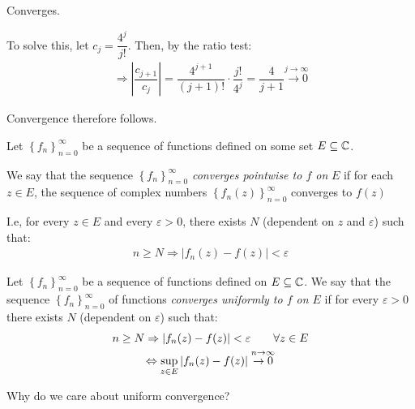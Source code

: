 \noindent Converges.
\par\bigskip
\noindent To solve this, let $c_j = \dfrac{4^j}{j!}$. Then, by the ratio test:
\begin{equation*}
  \begin{gathered}
    \Rightarrow \left|\dfrac{c_{j+1}}{c_j}\right| = \dfrac{4^{j+1}}{(j+1)!}\cdot\dfrac{j!}{4^j} = \dfrac{4}{j+1}\stackrel{j\to\infty}{\to0}
  \end{gathered}
\end{equation*}\par
\noindent Convergence therefore follows.
\newpage
\begin{theo}{}
  Let $\left\{f_n\right\}_{n=0}^\infty$ be a sequence of functions defined on some set $E\subseteq\mathbb{C}$.\par
  \noindent We say that the sequence $\left\{f_n\right\}_{n=0}^\infty$ \textit{converges pointwise to $f$ on } $E$ if for each $z\in E$, the sequence of complex numbers $\left\{f_n(z)\right\}_{n=0}^\infty$  converges to $f(z)$
  \par\bigskip
  \noindent I.e, for every $z\in E$ and every $\varepsilon>0$, there exists $N$ (dependent on $z$ and $\varepsilon$) such that:
  \begin{equation*}
    \begin{gathered}
      n\geq N\Rightarrow \left|f_n(z)-f(z)\right|<\varepsilon
    \end{gathered}
  \end{equation*}
\end{theo}
\par\bigskip
\begin{theo}{}
  Let $\left\{f_n\right\}_{n=0}^\infty$ be a sequence of functions defined on $E\subseteq \mathbb{C}$. We say that the sequence $\left\{f_n\right\}_{n=0}^\infty$  of functions \textit{converges uniformly to $f$ on $E$}  if for every $\varepsilon>0$ there exists $N$ (dependent on $\varepsilon$) such that:
  \begin{equation*}
    \begin{gathered}
      n\geq N\Rightarrow \left|f_n(z)-f(z)\right|<\varepsilon\qquad\forall z\in E\\
      \Leftrightarrow\sup_{z\in E}\left|f_n(z)-f(z)\right|\stackrel{n\to\infty}{\to0}
    \end{gathered}
  \end{equation*}
\end{theo}
\par\bigskip
\noindent Why do we care about uniform convergence?\par
